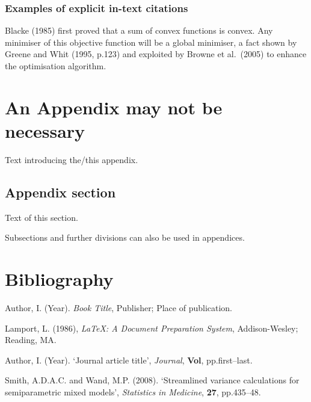 \documentclass[a4paper, 12pt, notitlepage]{report}
\begin{document}
\subsection{Examples of explicit in-text citations}
%
Blacke (1985) first proved that a sum of convex functions is convex. Any minimiser of this objective function will be a global minimiser, a fact shown by Greene and Whit (1995, p.123) and exploited by Browne et al.\ (2005) to enhance the optimisation algorithm.

\appendix
\chapter{An Appendix may not be necessary}
%
Text introducing the/this appendix.

\section{Appendix section}
%
Text of this section.

Subsections and further divisions can also be used in appendices.

\chapter*{Bibliography}
%
\begin{description}

\item Author, I. (Year). \emph{Book Title}, Publisher; Place of publication.

\item Lamport, L. (1986), \emph{\LaTeX: A Document Preparation System}, Addison-Wesley; Reading, MA.

\item Author, I. (Year). `Journal article title', \emph{Journal}, \textbf{Vol}, pp.first--last.

\item Smith, A.D.A.C. and Wand, M.P. (2008). `Streamlined variance calculations for semiparametric
mixed models', \emph{Statistics in Medicine}, \textbf{27}, pp.435--48.

\end{description}
\end{document}
